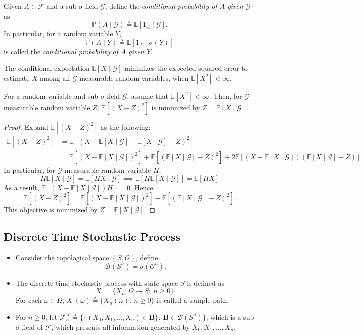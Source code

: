 \begin{definition}
Given $A\in\mathcal{F}$ and a sub-$\sigma$-field $\mathcal{G}$, define the 
\emph{conditional probability of $A$ given $\mathcal{G}$} as
\[
\mathbb{P}(A\mid \mathcal{G})\triangleq\mathbb{E}[1_A\mid \mathcal{G}].
\]
In particular, for a random variable $Y$,
\[
\mathbb{P}(A\mid Y)\triangleq\mathbb{E}[1_A\mid\sigma(Y)]
\]
is called the \emph{conditional probability of $A$ given $Y$}.
\end{definition}

The conditional expectation $\mathbb{E}[X\mid \mathcal{G}]$ minimizes the expected squared error to estimate $X$ among all $\mathcal{G}$-measurable random variables, when $\mathbb{E}[X^2]<\infty$.
\begin{theorem}
For a random variable and sub $\sigma$-field $\mathcal{G}$, assume that $\mathbb{E}[X^2]<\infty$.
Then, for  $\mathcal{G}$-measurable random variable $Z$,
$\mathbb{E}[(X-Z)^2]$ is minimized by $Z=\mathbb{E}[X\mid\mathcal{G}]$.
\end{theorem}
\begin{proof}
Expand $\mathbb{E}[(X-Z)^2]$ as the following:
\begin{align*}
\mathbb{E}[(X-Z)^2]&=\mathbb{E}[(X-\mathbb{E}[X\mid\mathcal{G}]+\mathbb{E}[X\mid\mathcal{G}]-Z)^2]\\
&=\mathbb{E}[(X-\mathbb{E}[X\mid\mathcal{G}])^2] + \mathbb{E}[(\mathbb{E}[X\mid\mathcal{G}]-Z)^2]+ 2\mathbb{E}[
(X-\mathbb{E}[X\mid\mathcal{G}])(\mathbb{E}[X\mid\mathcal{G}]-Z)
]
\end{align*}
In particular, for $\mathcal{G}$-measurable random variable $H$,
\[
H\mathbb{E}[X\mid\mathcal{G}] = \mathbb{E}[HX\mid\mathcal{G}]\implies
\mathbb{E}[H\mathbb{E}[X\mid\mathcal{G}]]=\mathbb{E}[HX]
\]
As a result, $\mathbb{E}[(X-\mathbb{E}[X\mid\mathcal{G}])H]=0$. Hence
\[
\mathbb{E}[(X-Z)^2] = \mathbb{E}[(X-\mathbb{E}[X\mid\mathcal{G}])^2] + \mathbb{E}[(\mathbb{E}[X\mid\mathcal{G}]-Z)^2].
\]
This objective is minimized by $Z=\mathbb{E}[X\mid\mathcal{G}]$.
\end{proof}

\subsection{Discrete Time Stochastic Process}
\begin{definition}
\begin{itemize}
\item
Consider the topological space $(S,\mathcal{O})$, define 
\[
\mathcal{B}(S^n) = \sigma(\mathcal{O}^n).
\]
\item
The discrete time stochastic process with state space $S$ is defined as 
\[
X_{\cdot}=\{X_n:\Omega\to S:~n\ge0 \}.
\]
For each $\omega\in\Omega$, $X_{\cdot}(\omega)\triangleq\{X_n(\omega):~n\ge0\}$ is called a sample path.
\item
For $n\ge0$, let $\mathcal{F}_n^X\triangleq \{
\{(X_0,X_1,\ldots,X_n)\in\bm B\}:~\bm B\in \mathcal{B}(S^n)
\}$, which is a sub $\sigma$-field of $\mathcal{F}$, which presents all information generated by $X_0,X_1,\ldots,X_n$.
\end{itemize}
\end{definition}

